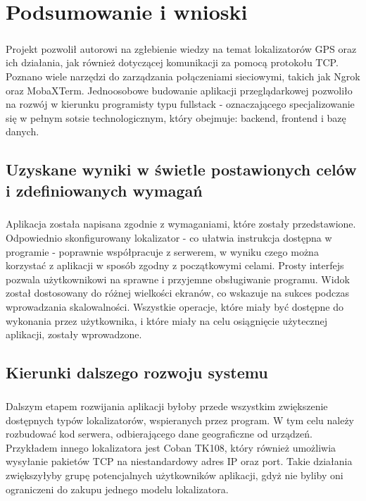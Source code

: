 \chapter{Podsumowanie i wnioski}

\paragraph{}
Projekt pozwolił autorowi na zgłebienie wiedzy na temat lokalizatorów GPS oraz ich działania, jak również dotyczącej komunikacji za pomocą protokołu TCP. Poznano wiele narzędzi do zarządzania połączeniami sieciowymi, takich jak Ngrok oraz MobaXTerm. Jednoosobowe budowanie aplikacji przeglądarkowej pozwoliło na rozwój w kierunku programisty typu fullstack - oznaczającego specjalizowanie się w pełnym sotsie technologicznym, który obejmuje: backend, frontend i bazę danych.

\section{Uzyskane wyniki w świetle postawionych celów i zdefiniowanych wymagań}
\paragraph{}
Aplikacja została napisana zgodnie z wymaganiami, które zostały przedstawione. Odpowiednio skonfigurowany lokalizator - co ułatwia instrukcja dostępna w programie - poprawnie współpracuje z serwerem, w wyniku czego można korzystać z aplikacji w sposób zgodny z początkowymi celami. Prosty interfejs pozwala użytkownikowi na sprawne i przyjemne obsługiwanie programu. Widok został dostosowany do różnej wielkości ekranów, co wskazuje na sukces podczas wprowadzania skalowalności. Wszystkie operacje, które miały być dostępne do wykonania przez użytkownika, i które miały na celu osiągnięcie użytecznej aplikacji, zostały wprowadzone.

\section{Kierunki dalszego rozwoju systemu}
\paragraph{}
Dalszym etapem rozwijania aplikacji byłoby przede wszystkim zwiększenie dostępnych typów lokalizatorów, wspieranych przez program. W tym celu należy rozbudować kod serwera, odbierającego dane geograficzne od urządzeń. Przykładem innego lokalizatora jest Coban TK108, który również umożliwia wysyłanie pakietów TCP na niestandardowy adres IP oraz port. Takie działania zwiększyłyby grupę potencjalnych użytkowników aplikacji, gdyż nie byliby oni ograniczeni do zakupu jednego modelu lokalizatora.
